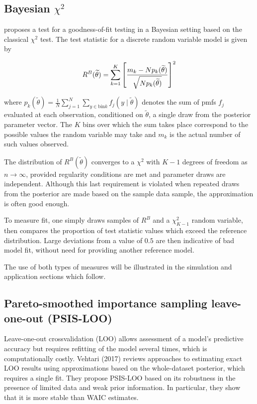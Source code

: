 \subsection{Bayesian $\chi^2$}

\cite{johnson2004bayesian} proposes a test for a goodness-of-fit testing in a Bayesian setting based on the classical $\chi^2$ test. The test statistic for a discrete random variable model is given by

\begin{equation}
R^B(\widetilde{\theta}) = \sum_{k=1}^K \left[{m_k - Np_k(\widetilde{\theta}) \over \sqrt{Np_k(\widetilde{\theta})}}\right]^2
\end{equation}

where $p_k(\widetilde{\theta}) = \frac{1}{N} \sum_{j=1}^N\sum_{y\in \text{bin}k}f_j(y \mid \widetilde{\theta})$ denotes the sum of pmfs $f_j$ evaluated at each observation, conditioned on $\widetilde{\theta}$, a single draw from the posterior parameter vector. The $K$ bins over which the sum takes place correspond to the possible values the random variable may take and $m_k$ is the actual number of such values observed.

The distribution of $R^B(\widetilde{\theta})$ converges to a $\chi^2$ with $K-1$ degrees of freedom as $n \rightarrow \infty$, provided regularity conditions are met and parameter draws are independent. Although this last requirement is violated when repeated draws from the posterior are made based on the sample data sample, the approximation is often good enough. 

To measure fit, one simply draws samples of $R^B$ and a  $\chi^2_{K-1}$ random variable, then compares the proportion of test statistic values which exceed the reference distribution. Large deviations from a value of $0.5$ are then indicative of bad model fit, without need for providing another reference model.

The use of both types of measures will be illustrated in the simulation and application sections which follow.

\subsection{Pareto-smoothed importance sampling leave-one-out (PSIS-LOO)}

Leave-one-out crossvalidation (LOO) allows assessment of a model's predictive accuracy but requires refitting of the model several times, which is computationally costly. Vehtari (2017) reviews approaches to estimating exact LOO results using approximations based on the whole-dataset posterior, which requires a single fit. They propose PSIS-LOO based on its robustness in the presence of limited data and weak prior information. In particular, they show that it is more stable than WAIC estimates.

